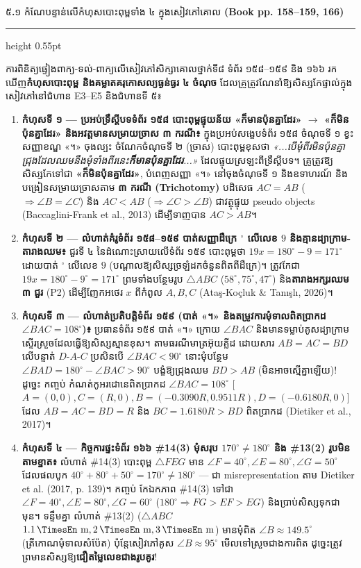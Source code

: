 \documentclass[a4paper,12pt]{article}
\newcommand{\en}[1]{{\TimesEn #1}}
\newcommand{\enbf}[1]{{\TimesEn\textbf{#1}}}
\newcommand{\unit}[1]{\,\text{\en{#1}}}
\newcommand{\tri}[1]{\ensuremath{\triangle #1}}
\newcommand{\ang}[1]{\ensuremath{\angle #1}}
\newcommand{\subsectitle}[1]{{\muol\fontsize{11pt}{14.5pt}\selectfont #1}}
\newcommand{\subsec}[1]{%
  \Needspace{1.6cm}%
  \vspace{2pt}%
  \subsectitle{#1}\par%
  \vspace{-2pt}%
  {\color{black}\hrule height 0.55pt}%
  \vspace{2pt}%
}
\begin{document}
\subsec{៥\enbf{.}១ កំណែបន្ទាន់លើកំហុសបោះពុម្ពទាំង ៤ ក្នុងសៀវភៅគោល \enbf{(Book pp. 158--159, 166)}}

ការពិនិត្យផ្ទៀងពាក្យ-ទល់-ពាក្យលើសៀវភៅសិក្សាគោលថ្នាក់ទី៨ ទំព័រ ១៥៨--១៥៩ និង ១៦៦ រកឃើញ\textbf{កំហុសបោះពុម្ព និងគម្លាតគរុកោសល្យធ្ងន់ធ្ងរ ៤ ចំណុច} ដែលគ្រូត្រូវណែនាំឱ្យសិស្សកែផ្ទាល់ក្នុងសៀវភៅនៅជំហាន \en{E3--E5} និងជំហានទី ៥៖

\begin{enumerate}[leftmargin=0.65cm, itemsep=3pt]
  \item \textbf{កំហុសទី ១ — ប្រអប់ទ្រឹស្ដីបទទំព័រ ១៥៨ បោះពុម្ពផ្ទុយន័យ «ក៏មានប៉ុនគ្នាដែរ» $\to$ «ក៏មិនប៉ុនគ្នាដែរ» និងអវត្តមានសម្រាយច្រាស ៣ ករណី៖} ក្នុងប្រអប់សង្ខេបទំព័រ ១៥៨ ចំណុចទី ១ ខ្វះសញ្ញាខណ្ឌ «។» ចុងល្បះ ចំណែកចំណុចទី ២ (ច្រាស) បោះពុម្ពខុសថា \textit{«...បើមុំពីរមិនប៉ុនគ្នា ជ្រុងដែលឈមនឹងមុំទាំងពីរនេះ\textbf{ក៏មានប៉ុនគ្នាដែរ}...»} ដែលផ្ទុយស្រឡះពីទ្រឹស្ដីបទ។ គ្រូត្រូវឱ្យសិស្សកែទៅជា \textbf{«ក៏មិនប៉ុនគ្នាដែរ»}, បំពេញសញ្ញា «។» នៅចុងចំណុចទី ១ និងឧទាហរណ៍ និងបង្រៀនសម្រាយច្រាសតាម \textbf{៣ ករណី (\en{Trichotomy})} បដិសេធ $AC=AB$ ($\Rightarrow\ang{B}=\ang{C}$) និង $AC<AB$ ($\Rightarrow\ang{C}>\ang{B}$) ជាវត្ថុផ្ទុយ \en{pseudo objects (Baccaglini-Frank et al., 2013)} ដើម្បីទាញបាន $AC>AB$។
  \item \textbf{កំហុសទី ២ — លំហាត់គំរូទំព័រ ១៥៨--១៥៩ បាត់សញ្ញាដឺក្រេ $^\circ$ លើលេខ $9$ និងគ្មានដ្យាក្រាម-តារាងឈម៖} ជួរទី ៤ នៃដំណោះស្រាយលើទំព័រ ១៥៩ បោះពុម្ពថា \en{$19x = 180^\circ - 9 = 171^\circ$} ដោយបាត់ $^\circ$ លើលេខ $9$ (បណ្ដាលឱ្យសិស្សច្រឡំដកចំនួនពិតពីដឺក្រេ)។ ត្រូវកែជា \textbf{\en{$19x = 180^\circ - 9^\circ = 171^\circ$}} ព្រមទាំងបន្ថែមរូប $\tri{ABC}$ ($58^\circ, 75^\circ, 47^\circ$) និង\textbf{តារាងអក្សរឈម ៣ ជួរ} (\en{P2}) ដើម្បីញែកអថេរ $x$ ពីកំពូល $A, B, C$ \en{(Ataş-Koçluk \& Tanışlı, 2026)}។
  \item \textbf{កំហុសទី ៣ — លំហាត់ប្រតិបត្តិទំព័រ ១៥៩ (បាត់ «។» និងតម្រូវការមុំទាលពិតប្រាកដ $\ang{BAC}=108^\circ$)៖} ប្រធានទំព័រ ១៥៩ បាត់ «។» ក្រោយ $\ang{BAC}$ និងមានទម្លាប់គូសដ្យាក្រាមស្ទើរស្រួចដែលធ្វើឱ្យសិស្សស្មានខុស។ តាមធរណីមាត្រអ៊ុយគ្លីដ ដោយសារ $AB=AC=BD$ លើបន្ទាត់ $D\text{-}A\text{-}C$ ប្រសិនបើ $\ang{BAC} < 90^\circ$ នោះមុំបន្ថែម $\ang{BAD}=180^\circ-\ang{BAC} > 90^\circ$ បង្ខំឱ្យជ្រុងឈម $BD > AB$ (មិនអាចស្មើគ្នាឡើយ)! ដូច្នេះ កញ្ចប់ \en{3.1} កំណត់កូអរដោនេពិតប្រាកដ $\ang{BAC}=108^\circ$ [$A=(0,0), C=(R,0), B=(-0.3090R, 0.9511R), D=(-0.6180R,0)$] ដែល $AB=AC=BD=R$ និង $BC=1.6180R>BD$ ពិតប្រាកដ \en{(Dietiker et al., 2017)}។
  \item \textbf{កំហុសទី ៤ — កិច្ចការផ្ទះទំព័រ ១៦៦ \en{\#14(3)} មុំសរុប $170^\circ\neq 180^\circ$ និង \en{\#13(2)} រូបមិនតាមខ្នាត៖} លំហាត់ \en{\#14(3)} បោះពុម្ព $\tri{FEG}$ មាន $\ang{F}=40^\circ, \ang{E}=80^\circ, \ang{G}=50^\circ$ ដែលផលបូក $40^\circ+80^\circ+50^\circ=170^\circ\neq 180^\circ$ — ជា \en{misrepresentation} តាម \en{Dietiker et al. (2017, p. 139)}។ កញ្ចប់ \en{3.1} កែឯកភាព \en{\#14(3)} ទៅជា \textbf{$\ang{F}=40^\circ, \ang{E}=80^\circ, \ang{G}=60^\circ$} ($180^\circ \Rightarrow FG>EF>EG$) និងប្រាប់សិស្សទុកជាមុន។ ទន្ទឹមគ្នា លំហាត់ \en{\#13(2)} ($\tri{ABC}$ $1.1\unit{m}, 2\unit{m}, 3\unit{m}$) មានមុំពិត $\ang{B}\approx 149.5^\circ$ (ត្រីកោណមុំទាលសំប៉ែត) ប៉ុន្តែសៀវភៅគូស $\ang{B}\approx 95^\circ$ មើលទៅស្រួចជាងការពិត ដូច្នេះត្រូវព្រមានសិស្សឱ្យ\textbf{ជឿតម្លៃលេខជាងរូបគូរ}!
\end{enumerate}
\end{document}
